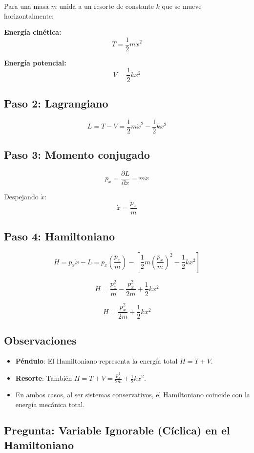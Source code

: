 \documentclass[a4paper]{article}
\begin{document}
Para una masa $m$ unida a un resorte de constante $k$ que se mueve horizontalmente:

\textbf{Energía cinética:}
$$T = \frac{1}{2}m\dot{x}^2$$

\textbf{Energía potencial:}
$$V = \frac{1}{2}kx^2$$

\subsection*{Paso 2: Lagrangiano}

$$L = T - V = \frac{1}{2}m\dot{x}^2 - \frac{1}{2}kx^2$$

\subsection*{Paso 3: Momento conjugado}

$$p_x = \frac{\partial L}{\partial \dot{x}} = m\dot{x}$$

Despejando $\dot{x}$:
$$\dot{x} = \frac{p_x}{m}$$

\subsection*{Paso 4: Hamiltoniano}

$$H = p_x\dot{x} - L = p_x\left(\frac{p_x}{m}\right) - \left[\frac{1}{2}m\left(\frac{p_x}{m}\right)^2 - \frac{1}{2}kx^2\right]$$

$$H = \frac{p_x^2}{m} - \frac{p_x^2}{2m} + \frac{1}{2}kx^2$$

$$\boxed{H = \frac{p_x^2}{2m} + \frac{1}{2}kx^2}$$

\subsection*{Observaciones}

\begin{itemize}
    \item \textbf{Péndulo}: El Hamiltoniano representa la energía total $H = T + V$.
    \item \textbf{Resorte}: También $H = T + V = \frac{p_x^2}{2m} + \frac{1}{2}kx^2$.
    \item En ambos casos, al ser sistemas conservativos, el Hamiltoniano coincide con la energía mecánica total.
\end{itemize}

\subsection*{Pregunta: Variable Ignorable (Cíclica) en el Hamiltoniano}
\end{document}
